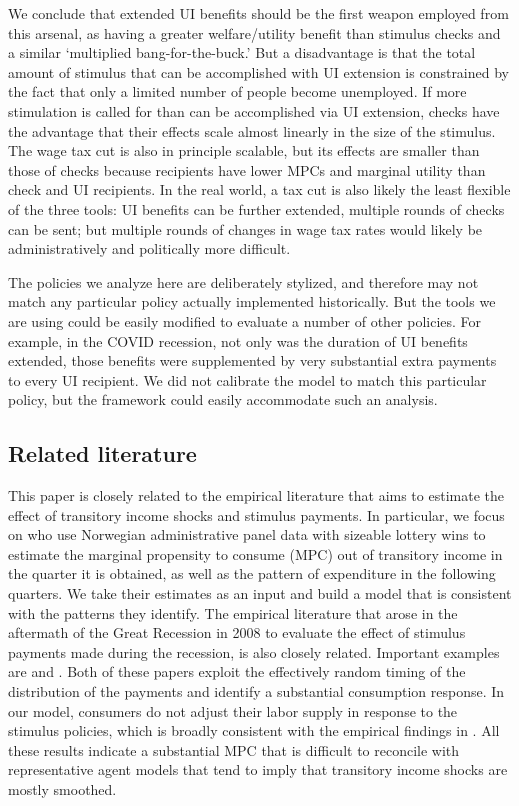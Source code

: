 \documentclass[../HAFiscal]{subfiles}
\begin{document}
We conclude that extended UI benefits should be the first weapon employed from this arsenal, as having a greater welfare/utility benefit than stimulus checks and a similar `multiplied bang-for-the-buck.' But a disadvantage is that the total amount of stimulus that can be accomplished with UI extension is constrained by the fact that only a limited number of people become unemployed.  If more stimulation is called for than can be accomplished via UI extension, checks have the advantage that their effects scale almost linearly in the size of the stimulus.  The wage tax cut is also in principle scalable, but its effects are smaller than those of checks because recipients have lower MPCs and marginal utility than check and UI recipients.  In the real world, a tax cut is also likely the least flexible of the three tools:  UI benefits can be further extended, multiple rounds of checks can be sent; but multiple rounds of changes in wage tax rates would likely be administratively and politically more difficult.

The policies we analyze here are deliberately stylized, and therefore may not match any particular policy actually implemented historically.  But the tools we are using could be easily modified to evaluate a number of other policies.  For example, in the COVID recession, not only was the duration of UI benefits extended, those benefits were supplemented by very substantial extra payments to every UI recipient.  We did not calibrate the model to match this particular policy, but the framework could easily accommodate such an analysis.

\subsection{Related literature}
\label{sec:lit}

This paper is closely related to the empirical literature that aims to estimate the effect of transitory income shocks and stimulus payments. In particular, we focus on \cite{fagereng_mpc_2021} who use Norwegian administrative panel data with sizeable lottery wins to estimate the marginal propensity to consume (MPC) out of transitory income in the quarter it is obtained, as well as the pattern of expenditure in the following quarters. We take their estimates as an input and build a model that is consistent with the patterns they identify. The empirical literature that arose in the aftermath of the Great Recession in 2008 to evaluate the effect of stimulus payments made during the recession, is also closely related. Important examples are \cite{parker2013consumer} and \cite{broda2014economic}. Both of these papers exploit the effectively random timing of the distribution of the payments and identify a substantial consumption response. In our model, consumers do not adjust their labor supply in response to the stimulus policies, which is broadly consistent with the empirical findings in \cite{ganong2022spending}. All these results indicate a substantial MPC that is difficult to reconcile with representative agent models that tend to imply that transitory income shocks are mostly smoothed. 
\end{document}
